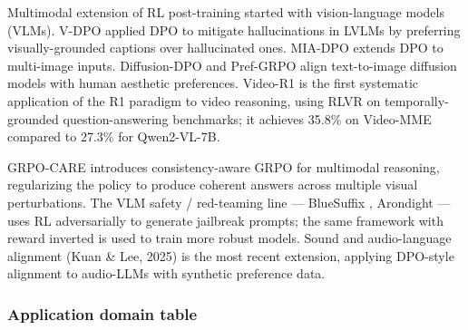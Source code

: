 \documentclass{article}
\begin{document}
Multimodal extension of RL post-training started with vision-language models (VLMs). V-DPO \citep{xie2024vdpomitigatinghall} applied DPO to mitigate hallucinations in LVLMs by preferring visually-grounded captions over hallucinated ones. MIA-DPO \citep{liu20252025} extends DPO to multi-image inputs. Diffusion-DPO \citep{wallace20242024} and Pref-GRPO \citep{wang20252025} align text-to-image diffusion models with human aesthetic preferences. Video-R1 \citep{feng20252025} is the first systematic application of the R1 paradigm to video reasoning, using RLVR on temporally-grounded question-answering benchmarks; it achieves 35.8\% on Video-MME compared to 27.3\% for Qwen2-VL-7B.

GRPO-CARE \citep{chen20252025} introduces consistency-aware GRPO for multimodal reasoning, regularizing the policy to produce coherent answers across multiple visual perturbations. The VLM safety / red-teaming line --- BlueSuffix \citep{zhao2023grouppreferenceopt}, Arondight \citep{liu20232023} --- uses RL adversarially to generate jailbreak prompts; the same framework with reward inverted is used to train more robust models. Sound and audio-language alignment (Kuan \& Lee, 2025) is the most recent extension, applying DPO-style alignment to audio-LLMs with synthetic preference data.

\subsubsection{Application domain table}\label{application-domain-table}
\end{document}
